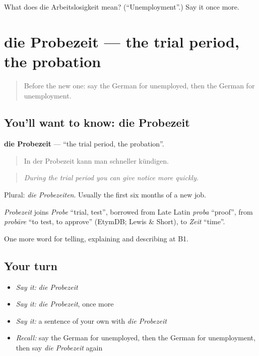 \begin{tcolorbox}[breakable,colback=teal!4,colframe=teal!35!black,title={Before you move on}]
What does die Arbeitslosigkeit mean? (\textquotedblleft{}Unemployment\textquotedblright{}.) Say it once more.
\end{tcolorbox}
\section[die Probezeit]{die Probezeit — the trial period, the probation}

\label{lesson:GE-C352-probezeit}



\begin{quote}
Before the new one: say the German for unemployed, then the German for unemployment.
\end{quote}

\subsection*{You'll want to know: die Probezeit}
\textbf{die Probezeit} — \textquotedblleft{}the trial period, the probation\textquotedblright{}.

\begin{quote}
In der Probezeit kann man schneller kündigen.
\end{quote}

\begin{quote}
\emph{During the trial period you can give notice more quickly.}
\end{quote}

Plural: \emph{die Probezeiten}. Usually the first six months of a new job.

\begin{cousinweb}
\emph{Probezeit} joins \emph{Probe} \textquotedblleft{}trial, test\textquotedblright{}, borrowed from Late Latin \emph{proba} \textquotedblleft{}proof\textquotedblright{}, from \emph{probāre} \textquotedblleft{}to test, to approve\textquotedblright{} (EtymDB; Lewis \& Short), to \emph{Zeit} \textquotedblleft{}time\textquotedblright{}.
\end{cousinweb}

\begin{grammarlens}[title={What you've built}]
One more word for telling, explaining and describing at B1.
\end{grammarlens}

\subsection*{Your turn}
\begin{itemize}
\raggedright
  \item \emph{Say it:} \emph{die Probezeit}
  \item \emph{Say it:} \emph{die Probezeit}, once more
  \item \emph{Say it:} a sentence of your own with \emph{die Probezeit}
  \item \emph{Recall:} say the German for unemployed, then the German for unemployment, then say \emph{die Probezeit} again
\end{itemize}

